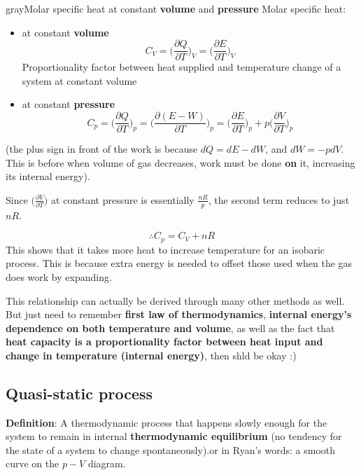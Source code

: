 \begin{mybox}{gray}{Molar specific heat at constant \textbf{volume} and \textbf{pressure}}
    Molar specific heat:
    \begin{itemize}
        \item at constant \textbf{volume}
              \begin{equation}
                  C_V=\bigg(\frac{\partial Q}{\partial T}\bigg)_V=\bigg(\frac{\partial E}{\partial T}\bigg)_V
              \end{equation}
              Proportionality factor between heat supplied and temperature change of a system at constant volume
        \item at constant \textbf{pressure}
              \begin{equation}
                  C_p
                  =\bigg(\frac{\partial Q}{\partial T}\bigg)_p
                  =\bigg(\frac{\partial (E-W)}{\partial T}\bigg)_p
                  =\bigg(\frac{\partial E}{\partial T}\bigg)_p+
                  p\bigg(\frac{\partial V}{\partial T}\bigg)_p
              \end{equation}
    \end{itemize}
    (the plus sign in front of the work is because $dQ=dE-dW$, and $dW=-pdV$. This is before when volume of gas decreases, work must be done \textbf{on} it, increasing its internal energy).
    \begin{flushleft}
        Since $\big(\frac{\partial V}{\partial T}\big)$ at constant pressure is essentially $\frac{nR}{p}$, the second term reduces to just $nR$.
    \end{flushleft}

    $$\boxed{\therefore C_p=C_V+nR}$$
    This shows that it takes more heat to increase temperature for an isobaric process. This is because extra energy is needed to offset those used when the gas does work by expanding.

    This relationship can actually be derived through many other methods as well. But just need to remember
    \textbf{first law of thermodynamics}, \textbf{internal energy's dependence on both temperature and volume}, as well as the fact that \textbf{heat capacity is a proportionality factor between heat input and change in temperature (internal energy)}, then shld be okay :)

\end{mybox}
\subsection{Quasi-static process}
\textbf{Definition}: A thermodynamic process that happens slowly enough for the system to remain in internal \textbf{thermodynamic equilibrium} (no tendency for the state of a system to change spontaneously).or in Ryan's words: a smooth curve on the $p-V$ diagram.
